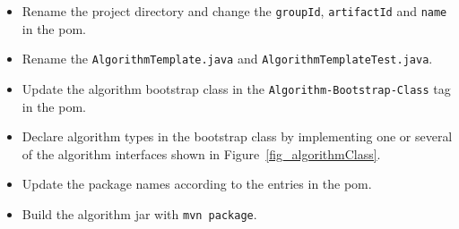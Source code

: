 \documentclass[10pt,a4paper]{article}
\begin{document}
\begin{itemize}
\item Rename the project directory and change the \texttt{groupId}, \texttt{artifactId} and \texttt{name} in the pom.
\item Rename the \texttt{AlgorithmTemplate.java} and \texttt{AlgorithmTemplateTest.java}.
\item Update the algorithm bootstrap class in the \texttt{Algorithm-Bootstrap-Class} tag in the pom.
\item Declare algorithm types in the bootstrap class by implementing one or several of the algorithm interfaces shown in Figure~\ref{fig_algorithmClass}.
\item Update the package names according to the entries in the pom.
\item Build the algorithm jar with \texttt{mvn package}.
\end{itemize}
\end{document}
